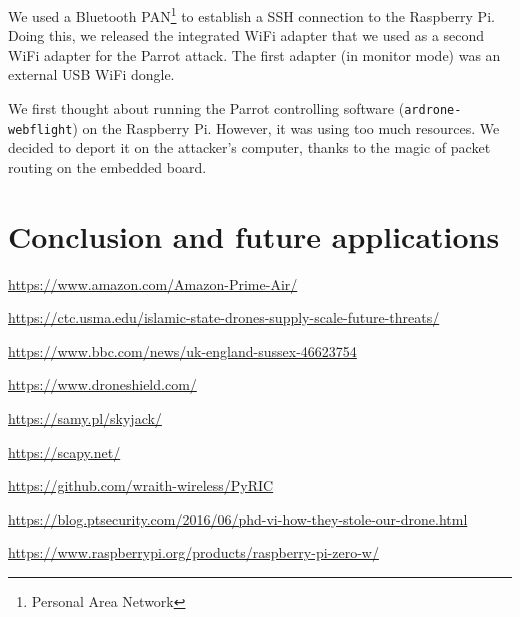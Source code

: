 \documentclass[conference,a4paper]{IEEEtran}
\newcommand{\myv}[1]{\texttt{\small#1}}
\begin{document}
We used a Bluetooth PAN\footnote{Personal Area Network} to establish a SSH connection to
the Raspberry Pi. Doing this, we released the integrated WiFi adapter that we used as a
second WiFi adapter for the Parrot attack. The first adapter (in monitor mode) was an
external USB WiFi dongle.

We first thought about running the Parrot controlling software (\myv{ardrone-webflight})
on the Raspberry Pi. However, it was using too much resources. We decided to deport it on
the attacker's computer, thanks to the magic of packet routing on the embedded board.



\section{Conclusion and future applications}





\begin{thebibliography}{1}
    \url{https://www.amazon.com/Amazon-Prime-Air/}

    \url{https://ctc.usma.edu/islamic-state-drones-supply-scale-future-threats/}

    \url{https://www.bbc.com/news/uk-england-sussex-46623754}

    \url{https://www.droneshield.com/}

    \url{https://samy.pl/skyjack/}

    \url{https://scapy.net/}

    \url{https://github.com/wraith-wireless/PyRIC}

    \url{https://blog.ptsecurity.com/2016/06/phd-vi-how-they-stole-our-drone.html}

    \url{https://www.raspberrypi.org/products/raspberry-pi-zero-w/}

\end{thebibliography}
\end{document}

